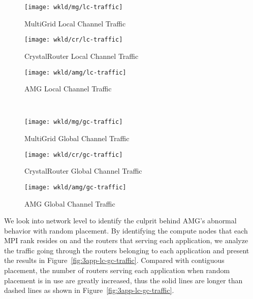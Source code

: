 \begin{figure*}[t]
    \centering
    \begin{subfigure}[t]{0.32\textwidth}
        \centering
        \texttt{[image: wkld/mg/lc-traffic]}
        \caption{MultiGrid Local Channel Traffic}
        \label{fig:mg-lc-traffic}
    \end{subfigure}\hfill
    \begin{subfigure}[t]{0.32\textwidth}
        \centering
        \texttt{[image: wkld/cr/lc-traffic]}
        \caption{CrystalRouter Local Channel Traffic}
        \label{fig:cr-lc-traffic}
    \end{subfigure}\hfill
    \begin{subfigure}[t]{0.32\textwidth}
        \centering
        \texttt{[image: wkld/amg/lc-traffic]}
        \caption{AMG Local Channel Traffic}
        \label{fig:amg-lc-traffic}
    \end{subfigure}\\  
    \centering
   \begin{subfigure}[t]{0.32\textwidth}
        \centering
        \texttt{[image: wkld/mg/gc-traffic]}
        \caption{MultiGrid Global Channel Traffic}
        \label{fig:mg-gc-traffic}
    \end{subfigure}\hfill
    \begin{subfigure}[t]{0.32\textwidth}
        \centering
        \texttt{[image: wkld/cr/gc-traffic]}
        \caption{CrystalRouter Global Channel Traffic}
        \label{fig:cr-gc-traffic}
    \end{subfigure}\hfill
    \begin{subfigure}[t]{0.32\textwidth}
        \centering
        \texttt{[image: wkld/amg/gc-traffic]}
        \caption{AMG Global Channel Traffic}
        \label{fig:amg-gc-traffic}
    \end{subfigure}
   \caption{The aggregate traffic go through the local and global channels of routers serving specific application. ``CA" and ``CPA" perform comparably, the corresponding lines are overlapped. More routers are involved in serving each application when random placement is in use, compared with contiguous placement.}
   \label{fig:3app-lc-gc-traffic}
\end{figure*}



We look into network level to identify the culprit behind AMG's abnormal behavior with random placement. 
By identifying the compute nodes that each MPI rank resides on and the routers that serving each application, 
we analyze the traffic going through the routers belonging to each application and 
present the results in Figure~\ref{fig:3app-lc-gc-traffic}. 
Compared with contiguous placement, 
the number of routers serving each application when random placement is in use are greatly increased, 
thus the solid lines are longer than dashed lines as shown in Figure~\ref{fig:3app-lc-gc-traffic}. 



